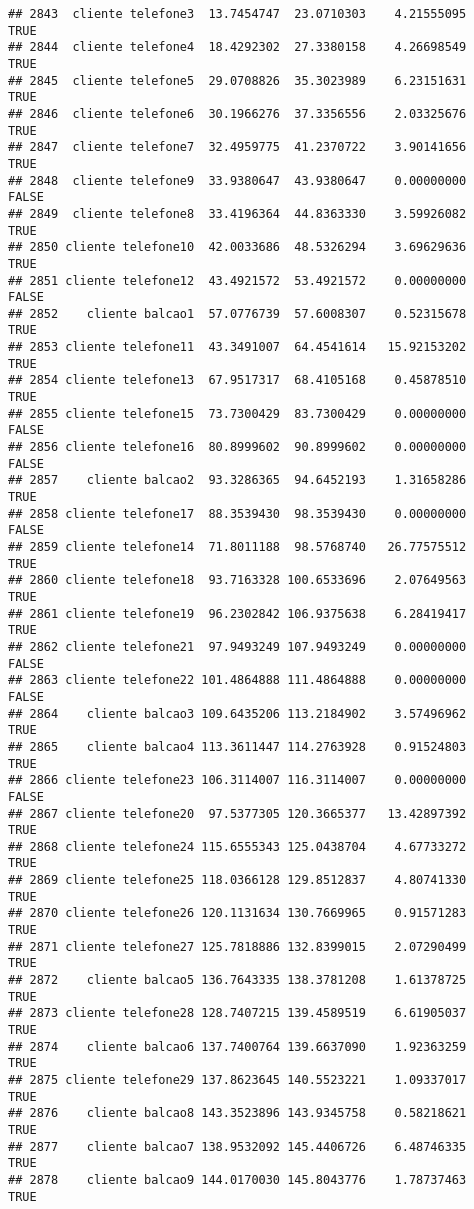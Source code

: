 \documentclass[
]{article}
\begin{document}
\begin{verbatim}
## 2843  cliente telefone3  13.7454747  23.0710303    4.21555095     TRUE
## 2844  cliente telefone4  18.4292302  27.3380158    4.26698549     TRUE
## 2845  cliente telefone5  29.0708826  35.3023989    6.23151631     TRUE
## 2846  cliente telefone6  30.1966276  37.3356556    2.03325676     TRUE
## 2847  cliente telefone7  32.4959775  41.2370722    3.90141656     TRUE
## 2848  cliente telefone9  33.9380647  43.9380647    0.00000000    FALSE
## 2849  cliente telefone8  33.4196364  44.8363330    3.59926082     TRUE
## 2850 cliente telefone10  42.0033686  48.5326294    3.69629636     TRUE
## 2851 cliente telefone12  43.4921572  53.4921572    0.00000000    FALSE
## 2852    cliente balcao1  57.0776739  57.6008307    0.52315678     TRUE
## 2853 cliente telefone11  43.3491007  64.4541614   15.92153202     TRUE
## 2854 cliente telefone13  67.9517317  68.4105168    0.45878510     TRUE
## 2855 cliente telefone15  73.7300429  83.7300429    0.00000000    FALSE
## 2856 cliente telefone16  80.8999602  90.8999602    0.00000000    FALSE
## 2857    cliente balcao2  93.3286365  94.6452193    1.31658286     TRUE
## 2858 cliente telefone17  88.3539430  98.3539430    0.00000000    FALSE
## 2859 cliente telefone14  71.8011188  98.5768740   26.77575512     TRUE
## 2860 cliente telefone18  93.7163328 100.6533696    2.07649563     TRUE
## 2861 cliente telefone19  96.2302842 106.9375638    6.28419417     TRUE
## 2862 cliente telefone21  97.9493249 107.9493249    0.00000000    FALSE
## 2863 cliente telefone22 101.4864888 111.4864888    0.00000000    FALSE
## 2864    cliente balcao3 109.6435206 113.2184902    3.57496962     TRUE
## 2865    cliente balcao4 113.3611447 114.2763928    0.91524803     TRUE
## 2866 cliente telefone23 106.3114007 116.3114007    0.00000000    FALSE
## 2867 cliente telefone20  97.5377305 120.3665377   13.42897392     TRUE
## 2868 cliente telefone24 115.6555343 125.0438704    4.67733272     TRUE
## 2869 cliente telefone25 118.0366128 129.8512837    4.80741330     TRUE
## 2870 cliente telefone26 120.1131634 130.7669965    0.91571283     TRUE
## 2871 cliente telefone27 125.7818886 132.8399015    2.07290499     TRUE
## 2872    cliente balcao5 136.7643335 138.3781208    1.61378725     TRUE
## 2873 cliente telefone28 128.7407215 139.4589519    6.61905037     TRUE
## 2874    cliente balcao6 137.7400764 139.6637090    1.92363259     TRUE
## 2875 cliente telefone29 137.8623645 140.5523221    1.09337017     TRUE
## 2876    cliente balcao8 143.3523896 143.9345758    0.58218621     TRUE
## 2877    cliente balcao7 138.9532092 145.4406726    6.48746335     TRUE
## 2878    cliente balcao9 144.0170030 145.8043776    1.78737463     TRUE

\end{verbatim}
\end{document}
